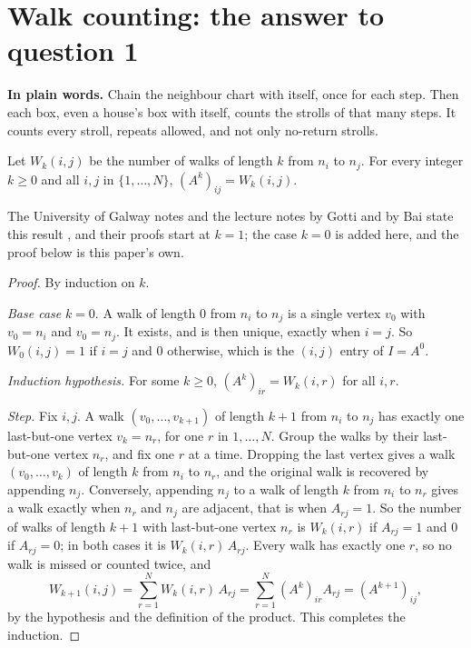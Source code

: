 \section{Walk counting: the answer to question 1}\label{sec:walks}

\plainstart\textbf{In plain words.} Chain the neighbour chart with itself, once for each step. Then each box, even a house's box with itself, counts the strolls of that many steps. It counts every stroll, repeats allowed, and not only no-return strolls.\plainend
\begin{theorem}\label{thm:walks}
Let $W_k(i,j)$ be the number of walks of length $k$ from $n_i$ to $n_j$. For every integer $k \ge 0$ and all $i, j$ in $\{1, \dots, N\}$, $(A^k)_{ij} = W_k(i,j)$.
\end{theorem}

The University of Galway notes and the lecture notes by Gotti and by Bai state this result \cite[Theorem 1.1.3, p.~4]{galway_adjacency_notes} \cite[Proposition 2, p.~1]{gotti_18211_lecture27} \cite[Theorem 1, p.~1]{bai_bimsa_adjacency}, and their proofs start at $k = 1$; the case $k = 0$ is added here, and the proof below is this paper's own.

\begin{proof}
By induction on $k$.

\emph{Base case} $k = 0$. A walk of length $0$ from $n_i$ to $n_j$ is a single vertex $v_0$ with $v_0 = n_i$ and $v_0 = n_j$. It exists, and is then unique, exactly when $i = j$. So $W_0(i,j) = 1$ if $i = j$ and $0$ otherwise, which is the $(i,j)$ entry of $I = A^0$.

\emph{Induction hypothesis.} For some $k \ge 0$, $(A^k)_{ir} = W_k(i,r)$ for all $i, r$.

\emph{Step.} Fix $i, j$. A walk $(v_0, \dots, v_{k+1})$ of length $k+1$ from $n_i$ to $n_j$ has exactly one last-but-one vertex $v_k = n_r$, for one $r$ in $1, \dots, N$. Group the walks by their last-but-one vertex $n_r$, and fix one $r$ at a time. Dropping the last vertex gives a walk $(v_0, \dots, v_k)$ of length $k$ from $n_i$ to $n_r$, and the original walk is recovered by appending $n_j$. Conversely, appending $n_j$ to a walk of length $k$ from $n_i$ to $n_r$ gives a walk exactly when $n_r$ and $n_j$ are adjacent, that is when $A_{rj} = 1$. So the number of walks of length $k+1$ with last-but-one vertex $n_r$ is $W_k(i,r)$ if $A_{rj} = 1$ and $0$ if $A_{rj} = 0$; in both cases it is $W_k(i,r)\,A_{rj}$. Every walk has exactly one $r$, so no walk is missed or counted twice, and
\[
W_{k+1}(i,j) = \sum_{r=1}^{N} W_k(i,r)\,A_{rj} = \sum_{r=1}^{N} (A^k)_{ir} A_{rj} = (A^{k+1})_{ij},
\]
by the hypothesis and the definition of the product. This completes the induction.
\end{proof}

